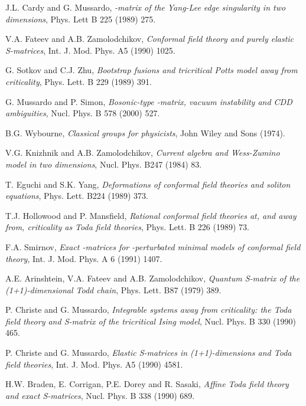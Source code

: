 \documentclass[a4paper,12pt]{report}
\begin{document}
\begin{thebibliography}{23}
 J.L. Cardy and G. Mussardo, {\it {}\coordHE{}-matrix of the Yang-Lee edge singularity in two dimensions},
Phys. Lett B 225 (1989) 275.

 V.A. Fateev and A.B. Zamolodchikov, {\it Conformal field theory and purely elastic S-matrices},
Int. J. Mod. Phys. A5 (1990) 1025.

 G. Sotkov and C.J. Zhu, \textit{Bootstrap fusions and tricritical Potts model away from criticality},
Phys. Lett. B 229 (1989) 391.

 G. Mussardo and P. Simon, \textit{Bosonic-type \coordHE{}-matrix, vacuum instability and CDD ambiguities},
Nucl. Phys. B 578 (2000) 527.



 B.G. Wybourne, \textit{Classical groups for physicists}, John Wiley and Sons (1974).


 V.G. Knizhnik and A.B. Zamolodchikov, {\it Current algebra and Wess-Zumino model in two dimensions},
Nucl. Phys. B247 (1984) 83.

 T. Eguchi and S.K. Yang, {\it Deformations of conformal field theories and soliton equations},
Phys. Lett. B224 (1989) 373.

 T.J. Hollowood and P. Mansfield, {\it Rational conformal field theories at, and away from, criticality
as Toda field theories}, Phys. Lett. B 226 (1989) 73.

 F.A. Smirnov, {\it Exact \coordHE{}-matrices for \coordHE{}-perturbated minimal models of conformal field
theory}, Int. J. Mod. Phys. A 6 (1991) 1407.

 A.E. Arinshtein, V.A. Fateev and A.B. Zamolodchikov, {\it Quantum S-matrix of the (1+1)-dimensional
Todd chain}, Phys. Lett. B87 (1979) 389.

 P. Christe and G. Mussardo, \textit{Integrable systems away from criticality: the Toda field theory and
S-matrix of the tricritical Ising model}, Nucl. Phys. B 330 (1990) 465.

 P. Christe and G. Mussardo, \textit{Elastic S-matrices in (1+1)-dimensions and Toda field theories},
Int. J. Mod. Phys. A5 (1990) 4581.

 H.W. Braden, E. Corrigan, P.E. Dorey and R. Sasaki, \textit{Affine Toda field theory and exact S-matrices},
Nucl. Phys. B 338 (1990) 689.


\end{thebibliography}
\end{document}
